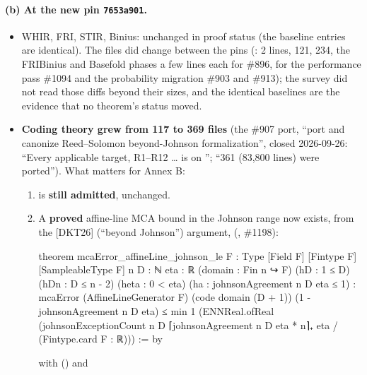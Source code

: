 \paragraph{(b) At the new pin \texttt{7653a901}.}
\begin{itemize}
\item WHIR, FRI, STIR, Binius: unchanged in proof status (the baseline entries are identical).
  The files did change between the pins (:
   2 lines,  121,
   234, the FRIBinius and Basefold phases a few lines
  each for \#896,  for the performance pass \#1094 and the probability migration
  \#903 and \#913); the survey did not read those diffs beyond their sizes, and the identical
  baselines are the evidence that no theorem's status moved.
\item \textbf{Coding theory grew from 117 to 369 files} (the \#907 port, ``port and canonize
  Reed--Solomon beyond-Johnson formalization'', closed 2026-09-26: ``Every applicable target,
  R1--R12 \ldots{} is on ''; ``361 (83,800 lines) were ported''). What matters for
  Annex B:
  \begin{enumerate}
  \item {} is \textbf{still admitted}, unchanged.
  \item A \textbf{proved} affine-line MCA bound in the Johnson range now exists, from the [DKT26]
    (``beyond Johnson'') argument, 
    (, \#1198):
\begin{leancode}
theorem mcaError_affineLine_johnson_le
    {F : Type} [Field F] [Fintype F] [SampleableType F] {n D : ℕ} {eta : ℝ}
    (domain : Fin n ↪ F) (hD : 1 ≤ D) (hDn : D ≤ n - 2) (heta : 0 < eta)
    (ha : johnsonAgreement n D eta ≤ 1) :
    mcaError (AffineLineGenerator F) (code domain (D + 1)) (1 - johnsonAgreement n D eta) ≤
      min 1 (ENNReal.ofReal
        (johnsonExceptionCount n D ⌈johnsonAgreement n D eta * n⌉₊ eta /
          (Fintype.card F : ℝ))) := by
\end{leancode}
    with 
    () and

\end{enumerate}
\end{itemize}

